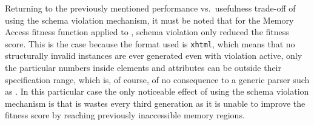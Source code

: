 Returning to the previously mentioned performance vs.\ usefulness trade-off of using the schema violation
mechanism, it must be noted that for the Memory Access fitness function applied to \libxml, schema
violation only reduced the fitness score. This is the case because the format used is \texttt{xhtml}, which
means that no structurally invalid instances are ever generated even with violation active, only the
particular numbers inside \xml elements and attributes can be outside their specification range, which is, of
course, of no consequence to a generic \xml parser such as \libxml. In this particular case the only
noticeable effect of using the schema violation mechanism is that is wastes every third generation as it is
unable to improve the fitness score by reaching previously inaccessible memory regions.



